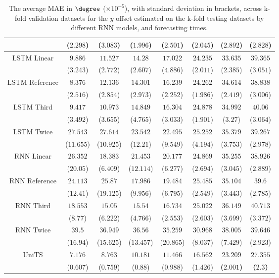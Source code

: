 \begin{table}[!ht]
{\begin{tabular}{|c|c|c|c|c|c|c|c|}
			 & ($2.298$) & ($3.083$) & ($1.996$) & ($2.501$) & ($2.045$) & ($2.892$) & ($2.828$) \\ \hline
			\multirow{2}{*}{LSTM Linear} & $9.886$ & $11.527$ & $14.28$ & $17.022$ & $24.235$ & $33.635$ & $39.365$ \\
			 & ($3.243$) & ($2.772$) & ($2.607$) & ($4.886$) & ($2.011$) & ($2.385$) & ($3.051$) \\ \hline
			\multirow{2}{*}{LSTM Reference} & $8.376$ & $12.136$ & $14.301$ & $16.239$ & $24.262$ & $34.614$ & $38.838$ \\
			 & ($2.516$) & ($2.854$) & ($2.973$) & ($2.252$) & ($1.986$) & ($2.419$) & ($3.006$) \\ \hline
			\multirow{2}{*}{LSTM Third} & $9.417$ & $10.973$ & $14.849$ & $16.304$ & $24.878$ & $34.992$ & $40.06$ \\
			 & ($3.492$) & ($3.655$) & ($4.765$) & ($3.033$) & ($1.901$) & ($3.27$) & ($3.064$) \\ \hline
			\multirow{2}{*}{LSTM Twice} & $27.543$ & $27.614$ & $23.542$ & $22.495$ & $25.252$ & $35.379$ & $39.267$ \\
			 & ($11.655$) & ($10.925$) & ($12.21$) & ($9.549$) & ($4.194$) & ($3.753$) & ($2.978$) \\ \hline
			\multirow{2}{*}{RNN Linear} & $26.352$ & $18.383$ & $21.453$ & $20.177$ & $24.869$ & $35.255$ & $38.926$ \\
			 & ($20.05$) & ($6.409$) & ($12.114$) & ($6.277$) & ($2.694$) & ($3.045$) & ($2.889$) \\ \hline
			\multirow{2}{*}{RNN Reference} & $24.113$ & $25.87$ & $17.986$ & $19.484$ & $25.485$ & $35.104$ & $39.6$ \\
			 & ($12.41$) & ($19.125$) & ($9.956$) & ($6.795$) & ($2.549$) & ($3.443$) & ($2.785$) \\ \hline
			\multirow{2}{*}{RNN Third} & $18.553$ & $15.05$ & $15.54$ & $16.734$ & $25.022$ & $36.149$ & $40.713$ \\
			 & ($8.77$) & ($6.222$) & ($4.766$) & ($2.553$) & ($2.603$) & ($3.699$) & ($3.372$) \\ \hline
			\multirow{2}{*}{RNN Twice} & $39.5$ & $36.949$ & $36.56$ & $35.259$ & $30.968$ & $38.005$ & $39.646$ \\
			 & ($16.94$) & ($15.625$) & ($13.457$) & ($20.865$) & ($8.037$) & ($7.429$) & ($2.923$) \\ \hline
			\multirow{2}{*}{UniTS} & $7.176$ & $8.763$ & $10.181$ & $11.466$ & $16.562$ & $\mathbf{23.209}$ & $\mathbf{27.355}$ \\
			 & ($0.607$) & ($0.759$) & ($0.88$) & ($0.988$) & ($1.426$) & \textbf{(}$\mathbf{2.001}$\textbf{)} & \textbf{(}$\mathbf{2.3}$\textbf{)} \\ \hline
		\end{tabular}
	}
	\caption{The average MAE in $\degree$ ($\times 10^{-5}$), with standard deviation in brackets, across k-fold validation datasets for the $y$ offset estimated on the k-fold testing datasets by different RNN models, and forecasting times.}
	\label{tab:all_latitude_no_abs_MAE}
\end{table}